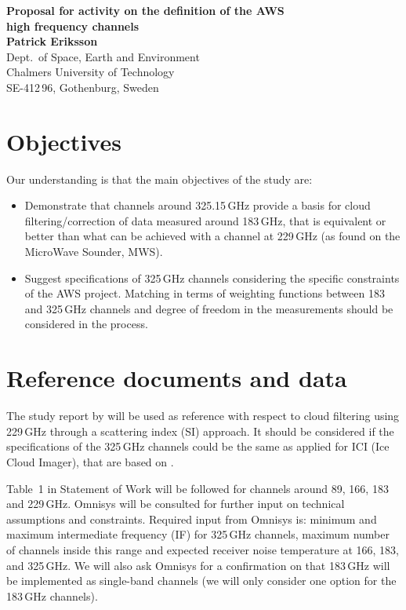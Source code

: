 \documentclass[BCOR=1cm,12pt,bibliography=totoc]{article}
\begin{document}
\noindent
\textbf{{\Large Proposal for activity on the definition of the AWS\vspace{0.5ex}\\
high frequency channels}}  \vspace{5mm}\\
{\bf Patrick Eriksson}\\
Dept.\ of Space, Earth and Environment\\
Chalmers University of Technology\\
SE-412\,96, Gothenburg, Sweden \vspace{10mm}


\section{Objectives}
\label{sec:objectives}
%
Our understanding is that the main objectives of the study are:
\begin{itemize}
\item Demonstrate that channels around 325.15\,GHz provide a basis for cloud
  filtering/correction of data measured around 183\,GHz, that is equivalent
  or better than what can be achieved with a channel at 229\,GHz (as found on
  the MicroWave Sounder, MWS). 
\item Suggest specifications of 325\,GHz channels considering the specific
  constraints of the AWS project. Matching in terms of weighting functions between
  183 and 325\,GHz channels and degree of freedom in the measurements should be
  considered in the process.
\end{itemize}


\section{Reference documents and data}
\label{sec:info}
%
The study report by \citet{rekha2012potential} will be used as reference with
respect to cloud filtering using 229\,GHz through a scattering index (SI)
approach. It should be considered if the specifications of the 325\,GHz
channels could be the same as applied for ICI (Ice Cloud Imager), that are
based on \citet{buehler:obser:12}.

Table~1 in Statement of Work will be followed for channels around 89, 166, 183
and 229\,GHz. Omnisys will be consulted for further input on technical
assumptions and constraints. Required input from Omnisys is: minimum and
maximum intermediate frequency (IF) for 325\,GHz channels, maximum number of
channels inside this range and expected receiver noise temperature at 166, 183,
and 325\,GHz. We will also ask Omnisys for a confirmation on that 183\,GHz
will be implemented as single-band channels (we will only consider one option
for the 183\,GHz channels).
\end{document}
